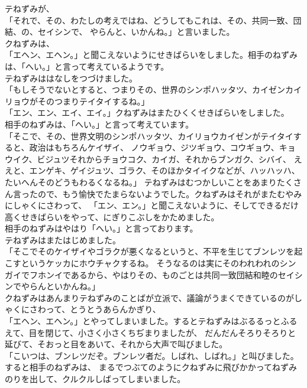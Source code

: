 \documentclass[
a4paper,
10pt,
book]
{tarticle}
\begin{document}
\indent テねずみが、\\
「それで、その、わたしの考えではね、どうしてもこれは、その、共同一致、団結、の、セイシンで、
やらんと、いかんね。」と言いました。\\
\indent クねずみは、\\
「エヘン、エヘン。」と聞こえないようにせきばらいをしました。相手のねずみは、「へい。」と言って考えているようです。\\
\indent テねずみははなしをつづけました。\\
「もしそうでないとすると、つまりその、世界のシンポハッタツ、カイゼンカイリョウがそのつまりテイタイするね。」\\
「エン、エン、エイ、エイ。」クねずみはまたひくくせきばらいをしました。\\
\indent 相手のねずみは、「へい。」と言って考えています。\\
「そこで、その、世界文明のシンポハッタツ、カイリョウカイゼンがテイタイすると、政治はもちろんケイザイ、
ノウギョウ、ジツギョウ、コウギョウ、キョウイク、ビジュツそれからチョウコク、カイガ、それからブンガク、シバイ、
ええと、エンゲキ、ゲイジュツ、ゴラク、そのほかタイイクなどが、ハッハッハ、たいへんそのどうもわるくなるね。」
テねずみはむつかしいことをあまりたくさん言ったので、もう愉快でたまらないようでした。クねずみはそれがまたむやみにしゃくにさわって、
「エン、エン。」と聞こえないように、そしてできるだけ高くせきばらいをやって、にぎりこぶしをかためました。\\
\indent 相手のねずみはやはり「へい。」と言っております。\\
\indent テねずみはまたはじめました。\\
「そこでそのケイザイやゴラクが悪くなるというと、不平を生じてブンレツを起こすというケッカにホウチャクするね。
そうなるのは実にそのわれわれのシンガイでフホンイであるから、やはりその、ものごとは共同一致団結和睦のセイシンでやらんといかんね。」\\
\indent クねずみはあんまりテねずみのことばが立派で、議論がうまくできているのがしゃくにさわって、とうとうあらんかぎり、\\
「エヘン、エヘン。」とやってしまいました。するとテねずみはぶるるっとふるえて、目を閉じて、小さく小さくちぢまりましたが、
だんだんそろりそろりと延びて、そおっと目をあいて、それから大声で叫びました。\\
「こいつは、ブンレツだぞ。ブンレツ者だ。しばれ、しばれ。」と叫びました。すると相手のねずみは、
まるでつぶてのようにクねずみに飛びかかってねずみのりを出して、クルクルしばってしまいました。\\
\end{document}
